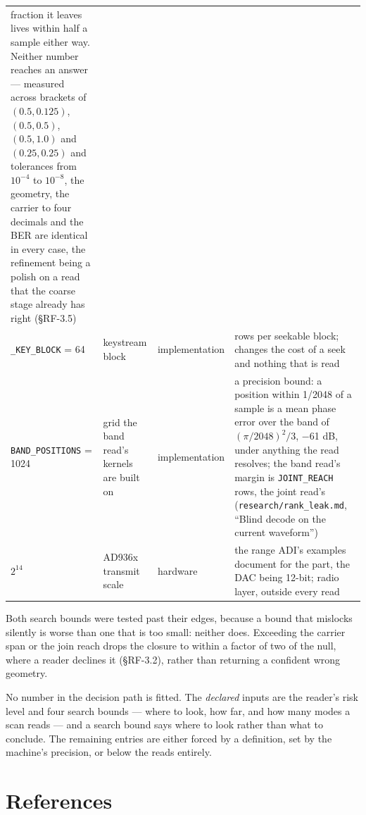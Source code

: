 \documentclass[10pt,letterpaper,twocolumn]{article}
\begin{document}
\begin{table}[tp]
\begin{tabular}{L{0.117\textwidth}L{0.150\textwidth}L{0.117\textwidth}L{0.550\textwidth}}
fraction it leaves lives within half a sample either way. Neither number
reaches an answer --- measured across brackets of \((0.5, 0.125)\),
\((0.5, 0.5)\), \((0.5, 1.0)\) and \((0.25, 0.25)\) and tolerances from
\(10^{-4}\) to \(10^{-8}\), the geometry, the carrier to four decimals
and the BER are identical in every case, the refinement being a polish
on a read that the coarse stage already has right (§RF-3.5) \\
\texttt{\_\allowbreak{}KEY\_\allowbreak{}BLOCK} = 64 & keystream block & implementation & rows per seekable block; changes the cost of a seek and nothing that is
read \\
\texttt{BAND\_\allowbreak{}POSITIONS} = 1024 & grid the band read's kernels are built on & implementation & a precision bound: a position within 1/2048 of a sample is a mean phase
error over the band of \((\pi/2048)^2/3\), −61 dB, under anything the
read resolves; the band read's margin is
\texttt{JOINT\_\allowbreak{}REACH} rows, the joint read's
(\texttt{research/\allowbreak{}rank\_\allowbreak{}leak.\allowbreak{}md},
``Blind decode on the current waveform'') \\
\(2^{14}\) & AD936x transmit scale & hardware & the range ADI's examples document for the part, the DAC being 12-bit;
radio layer, outside every read \\
\bottomrule
\end{tabular}
\end{table}

Both search bounds were tested past their edges, because a bound that mislocks silently is worse than one that is too small: neither does. Exceeding the carrier span or the join reach drops the closure to within a factor of two of the null, where a reader declines it (§RF-3.2), rather than returning a confident wrong geometry.

No number in the decision path is fitted. The \emph{declared} inputs are the reader's risk level and four search bounds --- where to look, how far, and how many modes a scan reads --- and a search bound says where to look rather than what to conclude. The remaining entries are either forced by a definition, set by the machine's precision, or below the reads entirely.

\section{References}\label{references}
\end{document}
